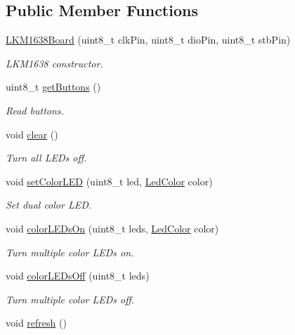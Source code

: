 \subsection*{Public Member Functions}
\begin{DoxyCompactItemize}
\item 
\hyperlink{class_l_k_m1638_board_a8526eb1bc413de3ea12c78b79d5d4bef}{L\+K\+M1638\+Board} (uint8\+\_\+t clk\+Pin, uint8\+\_\+t dio\+Pin, uint8\+\_\+t stb\+Pin)
\begin{DoxyCompactList}\small\item\em L\+K\+M1638 constructor. \end{DoxyCompactList}\item 
uint8\+\_\+t \hyperlink{class_l_k_m1638_board_a46b3777daa6d86b5a0e871fb99604898}{get\+Buttons} ()
\begin{DoxyCompactList}\small\item\em Read buttons. \end{DoxyCompactList}\item 
void \hyperlink{class_l_k_m1638_board_a487398df6c28769e87f20ea51e1395ee}{clear} ()\hypertarget{class_l_k_m1638_board_a487398df6c28769e87f20ea51e1395ee}{}\label{class_l_k_m1638_board_a487398df6c28769e87f20ea51e1395ee}

\begin{DoxyCompactList}\small\item\em Turn all L\+ED\textquotesingle{}s off. \end{DoxyCompactList}\item 
void \hyperlink{class_l_k_m1638_board_a58ee1bc95f31491e1e3d1bd67a85ca07}{set\+Color\+L\+ED} (uint8\+\_\+t led, \hyperlink{_erriez_l_k_m1638_board_8h_a81ea3de5b76240d46410f8b9acf4cbde}{Led\+Color} color)
\begin{DoxyCompactList}\small\item\em Set dual color L\+ED. \end{DoxyCompactList}\item 
void \hyperlink{class_l_k_m1638_board_a9c563169a60f4010b89449dce438ccb7}{color\+L\+E\+Ds\+On} (uint8\+\_\+t leds, \hyperlink{_erriez_l_k_m1638_board_8h_a81ea3de5b76240d46410f8b9acf4cbde}{Led\+Color} color)
\begin{DoxyCompactList}\small\item\em Turn multiple color L\+ED\textquotesingle{}s on. \end{DoxyCompactList}\item 
void \hyperlink{class_l_k_m1638_board_abf401ad1fa384a03732ed6e6d558ba2b}{color\+L\+E\+Ds\+Off} (uint8\+\_\+t leds)
\begin{DoxyCompactList}\small\item\em Turn multiple color L\+ED\textquotesingle{}s off. \end{DoxyCompactList}\item 
void \hyperlink{class_l_k_m1638_board_affcd16cf2844a7596f08251fab8e0d40}{refresh} ()\hypertarget{class_l_k_m1638_board_affcd16cf2844a7596f08251fab8e0d40}{}\label{class_l_k_m1638_board_affcd16cf2844a7596f08251fab8e0d40}


\end{DoxyCompactItemize}

